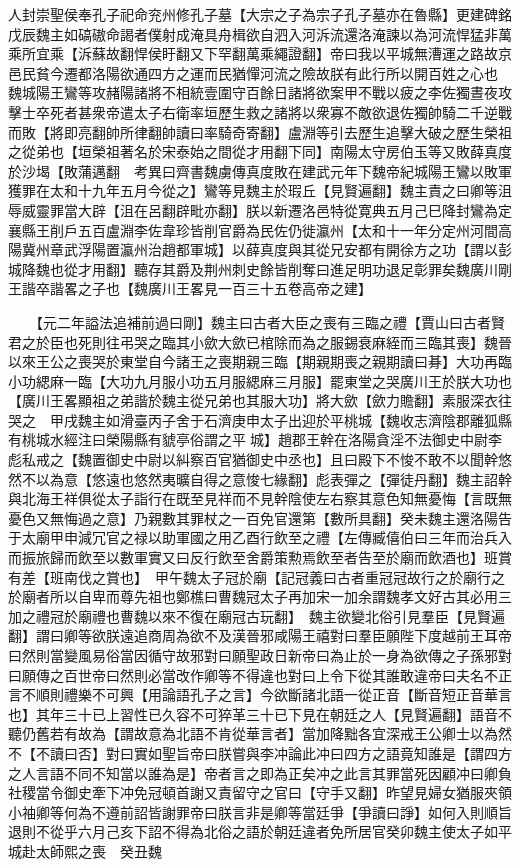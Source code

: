 人封崇聖侯奉孔子祀命兖州修孔子墓【大宗之子為宗子孔子墓亦在魯縣】更建碑銘戊辰魏主如碻磝命謁者僕射成淹具舟楫欲自泗入河泝流還洛淹諫以為河流悍猛非萬乘所宜乘【泝蘇故翻悍侯盱翻又下罕翻萬乘繩證翻】帝曰我以平城無漕運之路故京邑民貧今遷都洛陽欲通四方之運而民猶憚河流之險故朕有此行所以開百姓之心也　魏城陽王鸞等攻赭陽諸將不相統壹圍守百餘日諸將欲案甲不戰以疲之李佐獨晝夜攻擊士卒死者甚衆帝遣太子右衛率垣歷生救之諸將以衆寡不敵欲退佐獨帥騎二千逆戰而敗【將即亮翻帥所律翻帥讀曰率騎奇寄翻】盧淵等引去歷生追擊大破之歷生榮祖之從弟也【垣榮祖著名於宋泰始之間從才用翻下同】南陽太守房伯玉等又敗薛真度於沙堨【敗蒲邁翻　考異曰齊書魏虜傳真度敗在建武元年下魏帝紀城陽王鸞以敗軍獲罪在太和十九年五月今從之】鸞等見魏主於瑕丘【見賢遍翻】魏主責之曰卿等沮辱威靈罪當大辟【沮在呂翻辟毗亦翻】朕以新遷洛邑特從寛典五月己巳降封鸞為定襄縣王削戶五百盧淵李佐韋珍皆削官爵為民佐仍徙瀛州【太和十一年分定州河間高陽冀州章武浮陽置瀛州治趙都軍城】以薛真度與其從兄安都有開徐方之功【謂以彭城降魏也從才用翻】聽存其爵及荆州刺史餘皆削奪曰進足明功退足彰罪矣魏廣川剛王諧卒諧畧之子也【魏廣川王畧見一百三十五卷高帝之建】

　　【元二年謚法追補前過曰剛】魏主曰古者大臣之喪有三臨之禮【賈山曰古者賢君之於臣也死則往弔哭之臨其小歛大歛已棺除而為之服錫衰麻絰而三臨其喪】魏晉以來王公之喪哭於東堂自今諸王之喪期親三臨【期親期喪之親期讀曰朞】大功再臨小功緦麻一臨【大功九月服小功五月服緦麻三月服】罷東堂之哭廣川王於朕大功也【廣川王畧顯祖之弟諧於魏主從兄弟也其服大功】將大歛【歛力贍翻】素服深衣往哭之　甲戌魏主如滑臺丙子舍于石濟庚申太子出迎於平桃城【魏收志濟陰郡離狐縣有桃城水經注曰榮陽縣有䝞亭俗謂之平城】趙郡王幹在洛陽貪淫不法御史中尉李彪私戒之【魏置御史中尉以糾察百官猶御史中丞也】且曰殿下不悛不敢不以聞幹悠然不以為意【悠遠也悠然夷曠自得之意悛七緣翻】彪表彈之【彈徒丹翻】魏主詔幹與北海王祥俱從太子詣行在既至見祥而不見幹陰使左右察其意色知無憂悔【言既無憂色又無悔過之意】乃親數其罪杖之一百免官還第【數所具翻】癸未魏主還洛陽告于太廟甲申減冗官之禄以助軍國之用乙酉行飲至之禮【左傳臧僖伯曰三年而治兵入而振旅歸而飲至以數軍實又曰反行飲至舍爵策勲焉飲至者告至於廟而飲酒也】班賞有差【班南伐之賞也】　甲午魏太子冠於廟【記冠義曰古者重冠冠故行之於廟行之於廟者所以自卑而尊先祖也鄭樵曰曹魏冠太子再加宋一加余謂魏孝文好古其必用三加之禮冠於廟禮也曹魏以來不復在廟冠古玩翻】　魏主欲變北俗引見羣臣【見賢遍翻】謂曰卿等欲朕遠追商周為欲不及漢晉邪咸陽王禧對曰羣臣願陛下度越前王耳帝曰然則當變風易俗當因循守故邪對曰願聖政日新帝曰為止於一身為欲傳之子孫邪對曰願傳之百世帝曰然則必當改作卿等不得違也對曰上令下從其誰敢違帝曰夫名不正言不順則禮樂不可興【用論語孔子之言】今欲斷諸北語一從正音【斷音短正音華言也】其年三十已上習性已久容不可猝革三十已下見在朝廷之人【見賢遍翻】語音不聽仍舊若有故為【謂故意為北語不肯從華言者】當加降黜各宜深戒王公卿士以為然不【不讀曰否】對曰實如聖旨帝曰朕嘗與李冲論此冲曰四方之語竟知誰是【謂四方之人言語不同不知當以誰為是】帝者言之即為正矣冲之此言其罪當死因顧冲曰卿負社稷當令御史牽下冲免冠頓首謝又責留守之官曰【守手又翻】昨望見婦女猶服夾領小袖卿等何為不遵前詔皆謝罪帝曰朕言非是卿等當廷爭【爭讀曰諍】如何入則順旨退則不從乎六月己亥下詔不得為北俗之語於朝廷違者免所居官癸卯魏主使太子如平城赴太師熙之喪　癸丑魏

